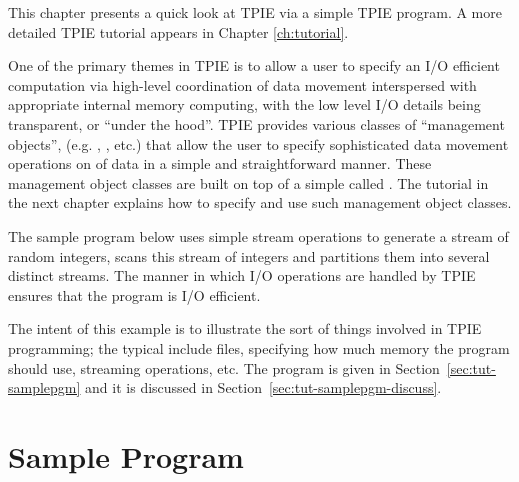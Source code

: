 This chapter presents a quick look
at TPIE via a simple TPIE program. A more detailed TPIE
tutorial appears in Chapter \ref{ch:tutorial}. 

One of the primary themes in TPIE is to allow a user to
specify an I/O efficient computation via 
high-level coordination of data movement interspersed with
appropriate internal memory computing, with the low level I/O
details being transparent, or ``under the hood''.
TPIE provides various classes of ``management objects'',
(e.g. , , etc.) that
allow the user to specify sophisticated data movement
operations on  of data in a simple and
straightforward manner. These management object classes are
built on top of a simple  called
. The tutorial in the next chapter explains
how to specify and use such management object classes.

The sample program below uses simple stream
operations %
to generate a stream of random integers, scans this stream
of integers and partitions them into several distinct
streams. The manner in which I/O operations are handled by
TPIE ensures that the program is I/O efficient.


The intent of this example is to illustrate the sort of
things involved in TPIE programming; the typical include
files, specifying how much memory the program should use,
streaming operations, etc. The program is given in
Section~\ref{sec:tut-samplepgm} and it is discussed in
Section~\ref{sec:tut-samplepgm-discuss}.


\section{Sample Program}


